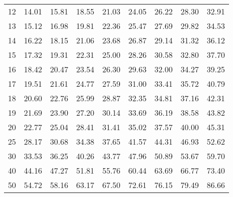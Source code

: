 \begin{center}
\begin{tabular}{r | rrrr | rrrr |}
  12 & \footnotesize 14.01 & \footnotesize 15.81 & \footnotesize 18.55 & \footnotesize 21.03 & \footnotesize 24.05 & \footnotesize 26.22 & \footnotesize 28.30 & \footnotesize 32.91 \\ 
  13 & \footnotesize 15.12 & \footnotesize 16.98 & \footnotesize 19.81 & \footnotesize 22.36 & \footnotesize 25.47 & \footnotesize 27.69 & \footnotesize 29.82 & \footnotesize 34.53 \\ 
  14 & \footnotesize 16.22 & \footnotesize 18.15 & \footnotesize 21.06 & \footnotesize 23.68 & \footnotesize 26.87 & \footnotesize 29.14 & \footnotesize 31.32 & \footnotesize 36.12 \\ 
  15 & \footnotesize 17.32 & \footnotesize 19.31 & \footnotesize 22.31 & \footnotesize 25.00 & \footnotesize 28.26 & \footnotesize 30.58 & \footnotesize 32.80 & \footnotesize 37.70 \\ 
  \hline
  16 & \footnotesize 18.42 & \footnotesize 20.47 & \footnotesize 23.54 & \footnotesize 26.30 & \footnotesize 29.63 & \footnotesize 32.00 & \footnotesize 34.27 & \footnotesize 39.25 \\ 
  17 & \footnotesize 19.51 & \footnotesize 21.61 & \footnotesize 24.77 & \footnotesize 27.59 & \footnotesize 31.00 & \footnotesize 33.41 & \footnotesize 35.72 & \footnotesize 40.79 \\ 
  18 & \footnotesize 20.60 & \footnotesize 22.76 & \footnotesize 25.99 & \footnotesize 28.87 & \footnotesize 32.35 & \footnotesize 34.81 & \footnotesize 37.16 & \footnotesize 42.31 \\ 
  19 & \footnotesize 21.69 & \footnotesize 23.90 & \footnotesize 27.20 & \footnotesize 30.14 & \footnotesize 33.69 & \footnotesize 36.19 & \footnotesize 38.58 & \footnotesize 43.82 \\ 
  20 & \footnotesize 22.77 & \footnotesize 25.04 & \footnotesize 28.41 & \footnotesize 31.41 & \footnotesize 35.02 & \footnotesize 37.57 & \footnotesize 40.00 & \footnotesize 45.31 \\ 
  \hline
  25 & \footnotesize 28.17 & \footnotesize 30.68 & \footnotesize 34.38 & \footnotesize 37.65 & \footnotesize 41.57 & \footnotesize 44.31 & \footnotesize 46.93 & \footnotesize 52.62 \\ 
  30 & \footnotesize 33.53 & \footnotesize 36.25 & \footnotesize 40.26 & \footnotesize 43.77 & \footnotesize 47.96 & \footnotesize 50.89 & \footnotesize 53.67 & \footnotesize 59.70 \\ 
  40 & \footnotesize 44.16 & \footnotesize 47.27 & \footnotesize 51.81 & \footnotesize 55.76 & \footnotesize 60.44 & \footnotesize 63.69 & \footnotesize 66.77 & \footnotesize 73.40 \\ 
  50 & \footnotesize 54.72 & \footnotesize 58.16 & \footnotesize 63.17 & \footnotesize 67.50 & \footnotesize 72.61 & \footnotesize 76.15 & \footnotesize 79.49 & \footnotesize 86.66 \\ 
  \hline
\end{tabular}
\label{fullChiSqTable}
\end{center}
